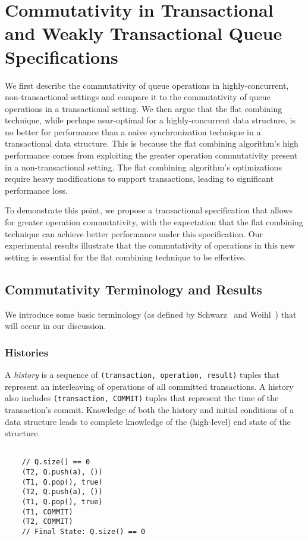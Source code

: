 \chapter{Commutativity in Transactional and Weakly Transactional Queue Specifications}
\label{commutativity}

We first describe the commutativity of queue operations in highly-concurrent, non-transactional settings and compare it to the commutativity of queue operations in a transactional setting. We then argue that the flat combining technique, while perhaps near-optimal for a highly-concurrent data structure, is no better for performance than a naive synchronization technique in a transactional data structure. This is because the flat combining algorithm's high performance comes from exploiting the greater operation commutativity present in a non-transactional setting. The flat combining algorithm's optimizations require heavy modifications to support transactions, leading to significant performance loss. 

To demonstrate this point, we propose a transactional specification that allows for greater operation commutativity, with the expectation that the flat combining technique can achieve better performance under this specification. Our experimental results illustrate that the commutativity of operations in this new setting is essential for the flat combining technique to be effective.

\section{Commutativity Terminology and Results}
We introduce some basic terminology (as defined by Schwarz~\cite{schwarz} and Weihl~\cite{weihl}) that will occur in our discussion.

\subsection{Histories}
\begin{defn}
    A \emph{history} is a sequence of \texttt{(transaction, operation, result)} tuples that represent an interleaving of operations of all committed transactions. A history also includes \texttt{(transaction, COMMIT)} tuples that represent the time of the transaction's commit. Knowledge of both the history and initial conditions of a data structure leads to complete knowledge of the (high-level) end state of the structure.

\begin{eg}
    \singlespacing   

    \begin{lstlisting}

    // Q.size() == 0 
    (T2, Q.push(a), ())
    (T1, Q.pop(), true)
    (T2, Q.push(a), ())
    (T1, Q.pop(), true)
    (T1, COMMIT)
    (T2, COMMIT)
    // Final State: Q.size() == 0 
    \end{lstlisting}
    \doublespacing
\end{eg}

\end{defn}

